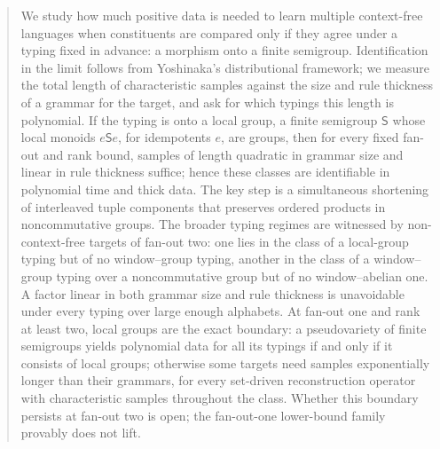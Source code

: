 \begin{abstract}
We study how much positive data is needed to learn multiple context-free
languages when constituents are compared only if they agree under a typing
fixed in advance: a morphism onto a finite semigroup.  Identification in the
limit follows from Yoshinaka's distributional framework; we measure the total
length of characteristic samples against the size and rule thickness of a
grammar for the target, and ask for which typings this length is polynomial.
If the typing is onto a local group, a finite semigroup $\mathsf S$ whose local
monoids $e\mathsf Se$, for idempotents $e$, are groups, then for every fixed
fan-out and rank bound, samples of length quadratic in grammar size and linear
in rule thickness suffice; hence these classes are identifiable in polynomial
time and thick data.  The key step is a simultaneous shortening of interleaved
tuple components that preserves ordered products in noncommutative groups.
The broader typing regimes are witnessed by non-context-free targets of fan-out
two: one lies in the class of a local-group typing but of no window--group
typing, another in the class of a window--group typing over a noncommutative
group but of no window--abelian one.  A
factor linear in both grammar size and rule thickness is unavoidable under
every typing over large enough alphabets.  At fan-out one and rank at least
two, local groups are the exact boundary: a pseudovariety of finite semigroups
yields polynomial data for all its typings if and only if it consists of local
groups; otherwise some targets need samples exponentially longer than their
grammars, for every set-driven reconstruction operator with characteristic
samples throughout the class.  Whether this boundary persists at fan-out two
is open; the fan-out-one lower-bound family provably does not lift.
\end{abstract}

